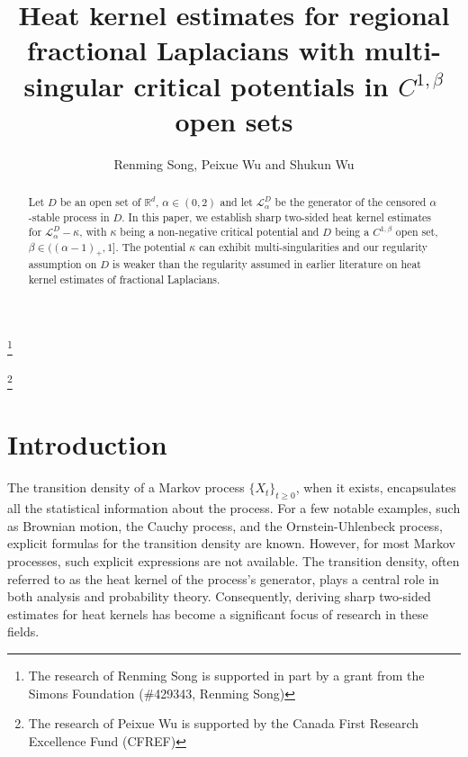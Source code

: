 \documentclass[12pt,a4paper]{amsart}
\numberwithin{equation}{section}
\theoremstyle{plain}
\newcommand{\R}{\mathbb{R}}
\newcommand{\1}{\mathbbm{1}}
\begin{document}
\title[Regional fractional Laplacian with multi-singular critical perturbation]{Heat kernel estimates for regional fractional Laplacians with multi-singular critical potentials
in $C^{1, \beta}$ open sets
}
\author[R. Song, P. Wu and S. Wu]{Renming Song, Peixue Wu and Shukun Wu}
\address{Renming Song\\ Department of Mathematics\\ University of Illinois Urbana-Champaign \\ Urbana \\ IL 61801\\ USA}
\thanks{The research of Renming Song is supported in part by a grant from the Simons Foundation (\#429343, Renming Song)}

\address{Peixue Wu\\ Institute for Quantum computing, Department of Applied Mathematics\\ University of Waterloo\\ON, Canada}
\thanks{The research of Peixue Wu is supported by the Canada First Research
Excellence Fund (CFREF)}
\address{Shukun Wu\\ Department of Mathematics \\ Indiana University\\ Bloomington \\ IN \\ USA }


\begin{abstract}
Let $D$ be an open set of $\R^d$, $\alpha\in (0, 2)$ and let $\mathcal{L}_{\alpha}^D$ be the generator of the censored $\alpha$-stable process in $D$. In this paper, we establish sharp two-sided heat kernel estimates for $\mathcal{L}_{\alpha}^D-\kappa$,  with $\kappa$ being a non-negative critical potential and $D$ being a $C^{1, \beta}$ open set, $\beta \in ((\alpha-1)_+,1]$. The potential $\kappa$ can exhibit multi-singularities and our regularity assumption on $D$ is weaker than the regularity assumed in earlier literature on heat kernel estimates of fractional Laplacians.  
\end{abstract}

\maketitle
\section{Introduction}\label{s:intro}
The transition density of a Markov process $\{X_t\}_{t\ge0}$, when it exists, encapsulates all the statistical information about the process. For a few notable examples, such as Brownian motion, the Cauchy process, and the Ornstein-Uhlenbeck process, explicit formulas for the transition density are known. However, for most Markov processes, such explicit expressions are not available. The transition density, often referred to as the heat kernel of the process's generator, plays a central role in both analysis and probability theory. Consequently, deriving sharp two-sided estimates for heat kernels has become a significant focus of research in these fields.
\end{document}
